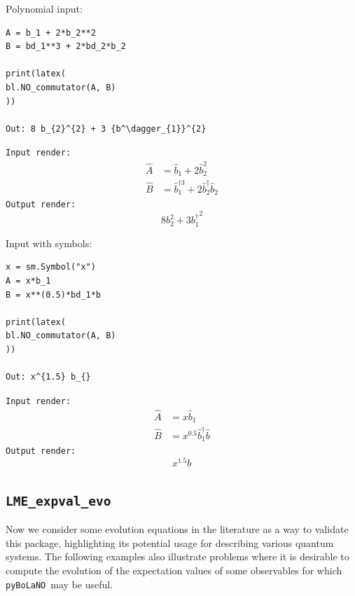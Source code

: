 \documentclass[5p, twocolumn, 10pt, sort&compress]{elsarticle}
\newcommand{\inlinecode}[1]{\texttt{#1}}
\newcommand{\bop}{\hat{b}}
\newcommand{\bdag}{\bop^\dagger}
\newcommand{\bdagn}[1]{\bop^{\dagger {#1}}}
\newcommand{\pybolano}{\texttt{pyBoLaNO}~}
\newenvironment{revision2}{%
\color{red}
}
{}
\begin{document}
\noindent Polynomial input:
\begin{verbatim}
A = b_1 + 2*b_2**2
B = bd_1**3 + 2*bd_2*b_2

print(latex(
bl.NO_commutator(A, B)
))

Out: 8 b_{2}^{2} + 3 {b^\dagger_{1}}^{2}
\end{verbatim}
\begin{revision2}
\noindent\inlinecode{Input render:}
\begin{align*}
    \hat{A} &= \bop_1+2\bop_2^2
    \\
    \hat{B} &= \bdagn{3}_1+2\bdag_2\bop_2
\end{align*}
\noindent\noindent\inlinecode{Output render:}
\begin{equation*}
    8 b_{2}^{2} + 3 {b^\dagger_{1}}^{2}
\end{equation*}
\end{revision2}

\newpage
\noindent Input with symbols:
\begin{verbatim}
x = sm.Symbol("x")
A = x*b_1 
B = x**(0.5)*bd_1*b

print(latex(
bl.NO_commutator(A, B)
))

Out: x^{1.5} b_{}
\end{verbatim}
\begin{revision2}
\noindent\inlinecode{Input render:}
\begin{align*}
    \hat{A} &= x\bop_1
    \\
    \hat{B} &= x^{0.5}\bdag_1\bop
\end{align*}
\noindent\noindent\inlinecode{Output render:}
\begin{equation*}
    x^{1.5} b_{}
\end{equation*}
\end{revision2}


\subsection{\inlinecode{LME_expval_evo}}

Now we consider some evolution equations in the literature as a way to validate this package, highlighting its potential usage for describing various quantum systems.  The following examples also illustrate problems where it is desirable to compute the evolution of the expectation values of some observables for which \pybolano may be useful. 
\end{document}
